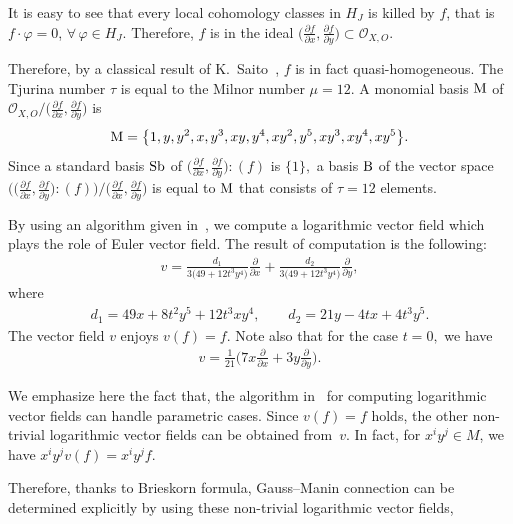 \documentclass[10pt,a4paper]{amsart}
\numberwithin{equation}{section}
\begin{document}
\begin{Example}
It is easy to see that every local cohomology classes in $H_J$ is killed by $f$, that is $ f\cdot \varphi =0$, $\forall\, \varphi \in H_J$. Therefore, $f$ is in the ideal $\big(\frac{\partial f}{\partial x}, \frac{\partial f}{\partial y}\big) \subset {\mathcal O}_{X,O}$.

Therefore, by a classical result of K.~Saito~\cite{S71}, $f$ is in fact quasi-homogeneous. The Tjurina number $\tau$ is equal to the Milnor number $\mu=12$.
A monomial basis ${\rm M}$ of $ {\mathcal O}_{X,O}/\big(\frac{\partial f}{\partial x}, \frac{\partial f}{\partial y}\big) $ is
\begin{gather*}
{\rm M} = \big\{1, y, y^2, x, y^3, xy, y^4, xy^2, y^5, xy^3, xy^4, xy^5 \big\}.
\end{gather*}
Since a standard basis ${\rm Sb} $ of $\big(\frac{\partial f}{\partial x}, \frac{\partial f}{\partial y}\big) : (f)$ is $\{1\},$ a basis ${\rm B}$ of the vector space
$ \big(\big(\frac{\partial f}{\partial x}, \frac{\partial f}{\partial y}\big) : (f)\big)/ \big(\frac{\partial f}{\partial x}, \frac{\partial f}{\partial y}\big)$ is
equal to ${\rm M}$ that consists of $\tau=12$ elements.

By using an algorithm given in~\cite{NT16b}, we compute a logarithmic vector field which plays the role of Euler vector field.
The result of computation is the following:
\begin{gather*}
v= \frac{d_1}{3\big(49+12t^3y^4\big)}\frac{\partial}{\partial x} + \frac{d_2}{3\big(49+12t^3y^4\big)}\frac{\partial}{\partial y},
\end{gather*}
where
\begin{gather*}
d_1=49x+8t^2y^5+12t^3xy^4, \qquad d_2=21y-4tx+4t^3y^5.
\end{gather*}
The vector field $ v$ enjoys $ v(f)=f$. Note also that for the case $ t=0, $ we have
\begin{gather*}
v= \frac{1}{21}\bigg(7x\frac{\partial}{\partial x} + 3y\frac{\partial}{\partial y}\bigg).
\end{gather*}

We emphasize here the fact that, the algorithm in~\cite{NT19a} for computing logarithmic vector fields can handle parametric cases.
Since $v(f)=f$ holds, the other non-trivial logarithmic vector fields can be obtained from~$v$.
In fact, for $x^i y^j \in M$, we have $x^i y^j v(f) = x^i y^j f$.

Therefore, thanks to Brieskorn formula, Gauss--Manin connection can be determined expli\-ci\-tly by using these non-trivial logarithmic vector fields,
\end{Example}
\end{document}
